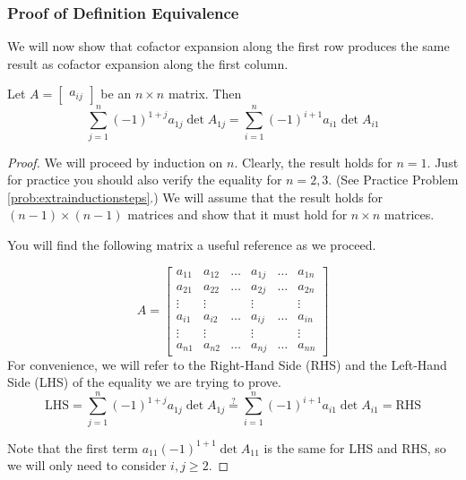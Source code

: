 \documentclass{ximera}
\begin{document}
\subsubsection*{Proof of Definition Equivalence}
We will now show that cofactor expansion along the first row produces the same result as cofactor expansion along the first column.
\begin{theorem}\label{th:rowcolexpequivalence}
Let $A=\begin{bmatrix}a_{ij}\end{bmatrix}$ be an $n\times n$ matrix.  Then
$$\sum_{j=1}^n(-1)^{1+j}a_{1j}\det{A_{1j}}=\sum_{i=1}^n(-1)^{i+1}a_{i1}\det{A_{i1}}$$
\end{theorem}
\begin{proof}
We will proceed by induction on $n$.  Clearly, the result holds for $n=1$.  Just for practice you should also verify the equality for $n=2, 3$. (See Practice Problem \ref{prob:extrainductionsteps}.)  We will assume that the result holds for $(n-1)\times (n-1)$ matrices and show that it must hold for $n\times n$ matrices.

You will find the following matrix a useful reference as we proceed.

$$A=\begin{bmatrix}a_{11} & a_{12} & \dots &  a_{1j} &  \dots & a_{1n}  \\
    a_{21} & a_{22} & \dots &  a_{2j} &  \dots & a_{2n}  \\
   \vdots & \vdots &  & \vdots &   & \vdots  \\
  a_{i1} & a_{i2} & \ldots &  a_{ij} &  \ldots & a_{in}\\
  \vdots & \vdots &  & \vdots &   & \vdots  \\
   a_{n1} & a_{n2} & \dots &  a_{nj} &  \dots & a_{nn}\end{bmatrix}$$
   For convenience, we will refer to the Right-Hand Side (RHS) and the Left-Hand Side (LHS) of the equality we are trying to prove.
   $$\text{LHS}=\sum_{j=1}^n(-1)^{1+j}a_{1j}\det{A_{1j}}\overset{?}{=}\sum_{i=1}^n(-1)^{i+1}a_{i1}\det{A_{i1}}=\text{RHS}$$
   
   Note that the first term $a_{11}(-1)^{1+1}\det{A_{11}}$ is the same for LHS and RHS, so we will only need to consider $i,j\geq 2$.
   

\end{proof}
\end{document}
